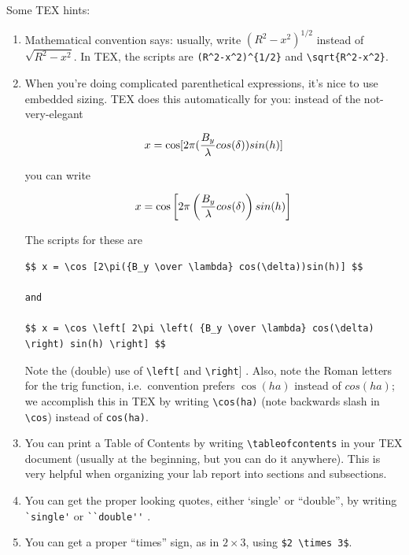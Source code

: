 \documentclass[11pt,preprint]{aastex}
\begin{document}
	Some TEX hints: \begin{enumerate}

	\item Mathematical convention says: usually, write
$(R^2-x^2)^{1/2}$ instead of $\sqrt{R^2-x^2}$.  In TEX, the scripts are
\verb$(R^2-x^2)^{1/2}$ and \verb$\sqrt{R^2-x^2}$. 

	\item When you're doing complicated parenthetical expressions,
it's nice to use embedded sizing. TEX does this automatically for you:
instead of the not-very-elegant

$$ x = \cos [2\pi({B_y \over \lambda} cos(\delta))sin(h)] $$

\noindent you can write

$$ x = \cos \left[ 2\pi \left( {B_y \over \lambda} cos(\delta) \right) sin(h) \right] $$

\noindent The scripts for these are

\begin{verbatim} 
$$ x = \cos [2\pi({B_y \over \lambda} cos(\delta))sin(h)] $$

and

$$ x = \cos \left[ 2\pi \left( {B_y \over \lambda} cos(\delta) \right) sin(h) \right] $$
\end{verbatim}

\noindent Note the (double) use of \verb$\left[$ and \verb$\right$] . 
Also, note the Roman letters for the trig function, i.e.\ convention
prefers $\cos(ha)$ instead of $cos(ha)$; we accomplish this in TEX by
writing \verb$\cos(ha)$ (note backwards slash in \verb$\cos$) instead of
\verb$cos(ha)$. 

\item You can print a Table of Contents by writing
\verb$\tableofcontents$ in your TEX document (usually at the beginning,
but you can do it anywhere). This is very helpful when
organizing your lab report into sections and subsections.

\item You can get the proper looking quotes, either `single' or
``double'', by writing \verb$`single'$ or \verb$``double''$ . 

\item You can get a proper ``times'' sign, as in $2 \times 3$, using
\verb=$2 \times 3$=. 


\end{enumerate}
\end{document}
